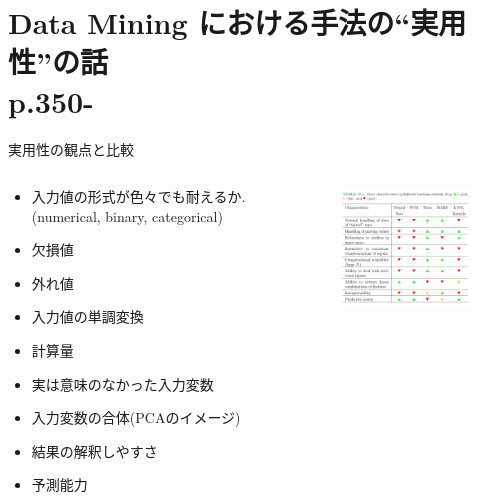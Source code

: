 \documentclass[dvipdfmx,8pt]{beamer}
\begin{document}
  \section{Data Mining における手法の``実用性''の話\\p.350-}
  \begin{frame}{実用性の観点と比較}
    \begin{columns}[t]
      \begin{column}{0.3\linewidth}
        \begin{itemize}
          \item 入力値の形式が色々でも耐えるか. (numerical, binary, categorical)
          \item 欠損値
          \item 外れ値
          \item 入力値の単調変換
          \item 計算量
          \item 実は意味のなかった入力変数
          \item 入力変数の合体(PCAのイメージ)
          \item 結果の解釈しやすさ
          \item 予測能力
        \end{itemize}
      \end{column}
      \begin{column}{0.7\linewidth}
        \begin{figure}[htb]
          \centering
          \includegraphics[width=7cm,clip]{images/OffTheShelf.png}
        \end{figure}
      \end{column}
    \end{columns}
  \end{frame}
\end{document}
